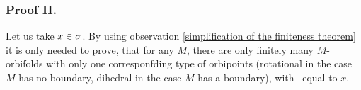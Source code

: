  
\subsubsection{Proof II.}

Let us take $x\in {\sigma}$. 
By using observation \ref{simplification of the finiteness theorem} it is only needed to prove, 
that for any $M$, there are only finitely many $M$-orbifolds with only one corresponfding 
type of orbipoints 
(rotational in the case $M$ has no boundary, dihedral in the case $M$ has a boundary),
with \Eoc\ equal to $x$. 

